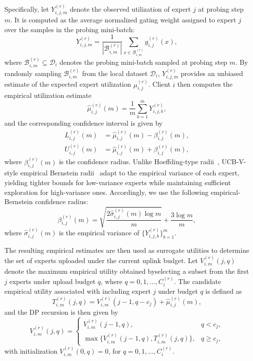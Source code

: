 \documentclass[conference]{IEEEtran}
\begin{document}
Specifically, let $Y_{i,j,m}^{(r)}$ denote the observed utilization of expert $j$ at probing step $m$. It is computed as the average normalized gating weight assigned to expert $j$ over the samples in the probing mini-batch:
\begin{equation}
Y_{i,j,m}^{(r)}
=
\frac{1}{|\mathcal{B}_{i,m}^{(r)}|}
\sum_{x\in \mathcal{B}_{i,m}^{(r)}}
g_{i,j}^{(r)}(x),
\end{equation}
where $\mathcal{B}_{i,m}^{(r)} \subseteq \mathcal{D}_i$ denotes the probing mini-batch sampled at probing step $m$. By randomly sampling $\mathcal{B}_{i,m}^{(r)}$ from the local dataset $\mathcal{D}_i$, $Y_{i,j,m}^{(r)}$ provides an unbiased estimate of the expected expert utilization $\mu_{i,j}^{(r)}$. Client $i$ then computes the empirical utilization estimate
\begin{equation}
\widehat{\mu}_{i,j}^{(r)}(m)
=
\frac{1}{m}
\sum_{b=1}^{m} Y_{i,j,b}^{(r)} ,
\end{equation}
and the corresponding confidence interval is given by
\begin{align}
L_{i,j}^{(r)}(m)
&=
\widehat{\mu}_{i,j}^{(r)}(m)
-
\beta_{i,j}^{(r)}(m),
\\
U_{i,j}^{(r)}(m)
&=
\widehat{\mu}_{i,j}^{(r)}(m)
+
\beta_{i,j}^{(r)}(m),
\end{align}
where $\beta_{i,j}^{(r)}(m)$ is the confidence radius. Unlike Hoeffding-type radii~\cite{auer2002finite}, UCB-V-style empirical Bernstein radii~\cite{audibert2009exploration} adapt to the empirical variance of each expert, yielding tighter bounds for low-variance experts while maintaining sufficient exploration for high-variance ones. Accordingly, we use the following empirical-Bernstein confidence radius:
\begin{equation}
\beta_{i,j}^{(r)}(m)
=
\sqrt{
\frac{
2\widehat{\sigma}_{i,j}^{(r)}(m)\log m
}{m}
}
+
\frac{3\log m}{m},
\end{equation}
where $\widehat{\sigma}_{i,j}^{(r)}(m)$ is the empirical variance of 
$\{Y_{i,j,b}^{(r)}\}_{b=1}^{m}$. 

The resulting empirical estimates are then used as surrogate utilities to determine the set of experts uploaded under the current uplink budget. Let $V_{i,m}^{(r)}(j,q)$ denote the maximum empirical utility obtained byselecting a subset from the first $j$ experts under upload budget $q$, where $q=0,1,\ldots,C_i^{(r)}$. The candidate empirical utility associated with including expert $j$ under budget $q$ is defined as
\begin{equation}
\label{eq:dp_take_value_xxx}
T_{i,m}^{(r)}(j,q)
=
V_{i,m}^{(r)}(j-1,q-c_j)
+
\widehat{\mu}_{i,j}^{(r)}(m),
\end{equation}
and the DP recursion is then given by
\begin{equation}
\label{eq:dp_recursion_empirical_xxx}
V_{i,m}^{(r)}(j,q)
=
\begin{cases}
V_{i,m}^{(r)}(j-1,q), & q<c_j,\\
\max\{V_{i,m}^{(r)}(j-1,q),T_{i,m}^{(r)}(j,q)\}, & q\geq c_j ,
\end{cases}
\end{equation}
with initialization $V_{i,m}^{(r)}(0,q)=0$, for $q=0,1,\ldots,C_i^{(r)}$. 
\end{document}
